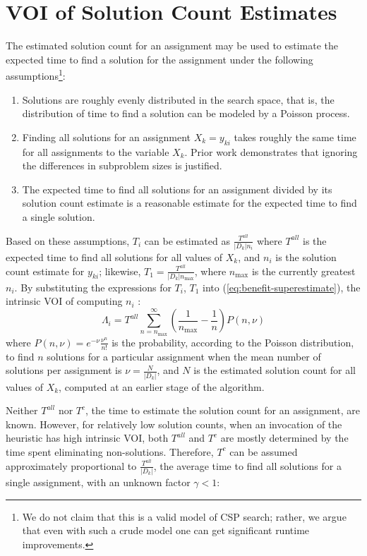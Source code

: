 \section{VOI of Solution Count Estimates}
\label{sec:csp-rational}

The estimated solution count for an assignment may be used to estimate
the expected time to find a solution for the assignment under the
following assumptions\footnote{We do not claim
that this is a valid model of CSP search; rather, we argue that even with such a crude model
one can get significant runtime improvements.}:
\begin{enumerate}
\item Solutions are roughly evenly distributed in the search space, that is,
   the distribution of time to find a solution can be modeled by a
   Poisson process.
\item Finding all solutions for an assignment $X_{k}=y_{ki}$
takes roughly the same time for all assignments to the variable $X_k$. Prior work
   \cite{Meisels.solcount,Kask.solcount} demonstrates that
   ignoring the differences in subproblem sizes is justified.
\item The expected time to find all solutions for an assignment
  divided by its solution count estimate is a
  reasonable estimate for the expected time to find a single solution. 
\end{enumerate}
Based on these assumptions, $T_i$ can be estimated as $\frac {T^{all}}
{|D_k|n_i}$ where $T^{all}$ is the expected time to find all
solutions for all values of $X_k$, and $n_i$ is the
solution count estimate for $y_{ki}$; likewise, $T_1=\frac
{T^{all}} {|D_k|n_\mathrm{max}}$, where $n_\mathrm{max}$ is the currently
greatest $n_i$.  By substituting the expressions for
$T_i$, $T_1$ into (\ref{eq:benefit-superestimate}), 
the intrinsic VOI of computing $n_i$ :
\begin{equation}
\label{eq:benefit-estimate-sc}
\Lambda_i=T^{all} \sum_{n=n_\mathrm{max}}^\infty\left(
  \frac 1 {n_\mathrm{max}} - \frac 1 n\right) P(n, \nu)
\end{equation}
where $P(n, \nu)=e^{-\nu}\frac {\nu^n} {n!}$ is the probability,
according to the Poisson distribution, to find $n$ solutions for a
particular assignment when the mean number of solutions per assignment
is $\nu=\frac N {|D_k|}$, and $N$ is the estimated solution count for
all values of $X_k$, computed at an earlier stage of the algorithm.

Neither $T^{all}$ nor $T^c$, the time to estimate the solution count
for an assignment, are known. However, for relatively low solution
counts, when an invocation of the heuristic has high intrinsic VOI, both
$T^{all}$ and $T^c$ are mostly determined by the time spent eliminating
non-solutions. Therefore, $T^c$ can be assumed approximately proportional
to $\frac {T^{all}} {|D_k|}$, the average time to find all solutions
for a single assignment, with an unknown factor $\gamma < 1$:

